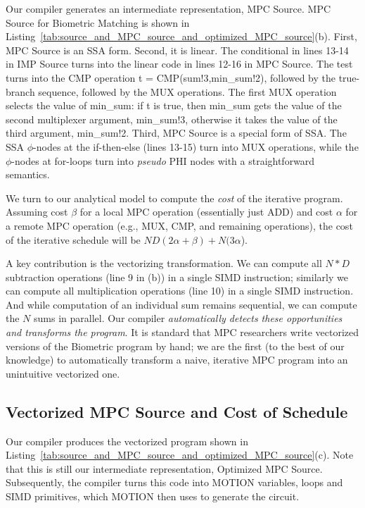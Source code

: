 Our compiler generates an intermediate representation, MPC Source. MPC Source
for Biometric Matching is shown in
Listing~\ref{tab:source_and_MPC_source_and_optimized_MPC_source}(b). First, MPC Source is an SSA form.
Second, it is linear. The conditional in lines 13-14 in IMP Source turns into the linear code in lines 12-16 in MPC Source.
The test turns into the CMP operation {\sf t = CMP(sum!3,min\_sum!2)}, followed by the
true-branch sequence, followed by the MUX operations. The first MUX operation selects the value
of {\sf min\_sum}: if {\sf t} is true, then {\sf min\_sum} gets the value of the second multiplexer
argument,  {\sf min\_sum!3}, otherwise it takes the value of the third argument, {\sf min\_sum!2}.
Third, MPC Source is a special form of SSA. The SSA $\phi$-nodes at the if-then-else (lines 13-15) turn into
MUX operations, while the $\phi$-nodes at for-loops turn into \emph{pseudo} PHI nodes with a straightforward semantics.

We turn to our analytical model to compute the \emph{cost} of the iterative program. Assuming
cost $\beta$ for a local MPC operation (essentially just ADD) and cost $\alpha$ for a remote
MPC operation (e.g., MUX, CMP, and remaining operations), the cost of the iterative schedule
will be $ND(2\alpha+\beta) + N(3\alpha$).

A key contribution is the vectorizing transformation. We can compute all $N*D$
subtraction operations (line 9 in (b)) in a single SIMD instruction; similarly we can compute
all multiplication operations (line 10) in a single SIMD instruction. And while computation
of an individual sum remains sequential, we can compute the $N$ sums in parallel.
Our compiler \emph{automatically detects these opportunities and transforms the program}.
It is standard that MPC researchers write vectorized versions of the Biometric
program by hand; we are the first (to the best of our knowledge) to automatically
transform a naive, iterative MPC program into an unintuitive vectorized one.

\subsection{Vectorized MPC Source and Cost of Schedule}

Our compiler produces the vectorized program shown in Listing~\ref{tab:source_and_MPC_source_and_optimized_MPC_source}(c).
Note that this is still our intermediate representation, Optimized MPC Source. Subsequently,
the compiler turns this code into MOTION variables, loops and SIMD primitives, which MOTION then
uses to generate the circuit.

